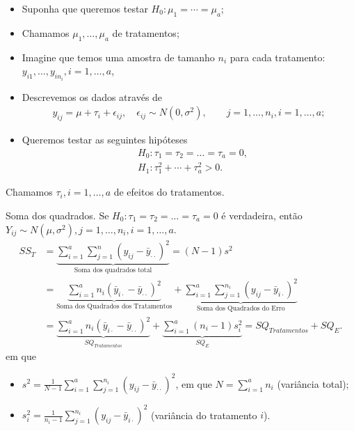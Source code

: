 \documentclass[8pt]{beamer}
\begin{document}
\begin{frame}{}

\normalsize
\begin{itemize}
	\item Suponha que queremos testar $H_0: \mu_1 = \cdots = \mu_a$;
	\item Chamamos $\mu_1, \dots, \mu_a$ de tratamentos;
	\item Imagine que temos uma amostra de tamanho $n_i$ para cada tratamento: $y_{i1}, \dots, y_{in_i}, i=1, \dots, a$, 
	\item  Descrevemos os dados através de
	\begin{align} \label{eq:anova-unbalanced}
	y_{ij} = \mu + \tau_i + \epsilon_{ij}, \quad \epsilon_{ij} \sim N(0, \sigma^2), \qquad j=1, \dots, n_i, i=1, \dots, a;
	\end{align}
	
	\item Queremos testar as seguintes hipóteses
	\begin{align*} 
	&H_0: \tau_1 = \tau_2 = \dots = \tau_a = 0,\\
	&H_1: \tau_1^2 + \cdots + \tau_a^2 > 0. 
	\end{align*}
\end{itemize}
Chamamos $\tau_i, i=1, \dots, a$ de efeitos do tratamentos.
\end{frame}

\begin{frame}{Soma dos quadrados.}
Se $H_0: \tau_1 = \tau_2 = \dots = \tau_a = 0$ é verdadeira, então $Y_{ij} \sim N(\mu, \sigma^2), j=1, \dots, n_i,\allowbreak i=1, \dots, a$.
\scriptsize 
\begin{align*}
SS_{T} &= \underbrace{\sum_{i=1}^{a} \sum_{j=1}^{n} (y_{ij} - \bar{y}_{\cdot \cdot})^2}_{\mbox{Soma dos quadrados total}} = (N-1)s^2\\
&= \underbrace{ \sum_{i=1}^{a} n_i (\bar{y}_{i\cdot} - \bar{y}_{\cdot \cdot})^2 }_{\mbox{Soma dos Quadrados dos Tratamentos}} + \underbrace{\sum_{i=1}^{a} \sum_{j=1}^{n_i} (y_{ij} - \bar{y}_{i\cdot})^2 }_{\mbox{Soma dos Quadrados do Erro}}\\
&= \underbrace{\sum_{i=1}^{a} n_i (\bar{y}_{i \cdot } - \bar{y}_{\cdot \cdot})^2 }_{SQ_{Tratamentos}} + \underbrace{\sum_{i=1}^{a} (n_i-1) s_i^2}_{SQ_E} = SQ_{Tratamentos} + SQ_E.
\end{align*}
\normalsize
em que
\begin{itemize}
	\item  $s^2 = \frac{1}{N-1} \sum_{i=1}^{a} \sum_{j=1}^{n_i} (y_{ij} - \bar{y}_{\cdot \cdot})^2$, em que $N = \sum_{i=1}^{a} n_i$ (variância total);
	\item $s^2_i = \frac{1}{n_i-1} \sum_{j=1}^{n_i} (y_{ij} - \bar{y}_{i\cdot})^2$ (variância do tratamento $i$).
\end{itemize}

\end{frame}
\end{document}
